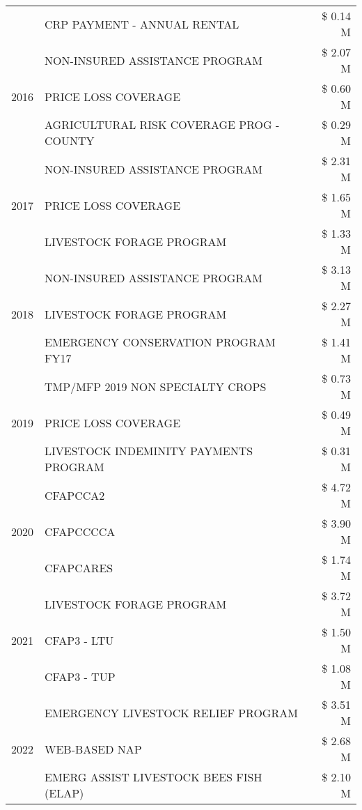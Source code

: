 \begin{tabular}{llr}
 & CRP PAYMENT - ANNUAL RENTAL & \$ 0.14 M \\
\cline{1-3}
\multirow[t]{3}{*}{2016} & NON-INSURED ASSISTANCE PROGRAM & \$ 2.07 M \\
 & PRICE LOSS COVERAGE & \$ 0.60 M \\
 & AGRICULTURAL RISK COVERAGE PROG - COUNTY & \$ 0.29 M \\
\cline{1-3}
\multirow[t]{3}{*}{2017} & NON-INSURED ASSISTANCE PROGRAM & \$ 2.31 M \\
 & PRICE LOSS COVERAGE & \$ 1.65 M \\
 & LIVESTOCK FORAGE PROGRAM & \$ 1.33 M \\
\cline{1-3}
\multirow[t]{3}{*}{2018} & NON-INSURED ASSISTANCE PROGRAM & \$ 3.13 M \\
 & LIVESTOCK FORAGE PROGRAM & \$ 2.27 M \\
 & EMERGENCY CONSERVATION PROGRAM FY17 & \$ 1.41 M \\
\cline{1-3}
\multirow[t]{3}{*}{2019} & TMP/MFP 2019 NON SPECIALTY CROPS & \$ 0.73 M \\
 & PRICE LOSS COVERAGE & \$ 0.49 M \\
 & LIVESTOCK INDEMINITY PAYMENTS PROGRAM & \$ 0.31 M \\
\cline{1-3}
\multirow[t]{3}{*}{2020} & CFAPCCA2 & \$ 4.72 M \\
 & CFAPCCCCA & \$ 3.90 M \\
 & CFAPCARES & \$ 1.74 M \\
\cline{1-3}
\multirow[t]{3}{*}{2021} & LIVESTOCK FORAGE PROGRAM & \$ 3.72 M \\
 & CFAP3 - LTU & \$ 1.50 M \\
 & CFAP3 - TUP & \$ 1.08 M \\
\cline{1-3}
\multirow[t]{3}{*}{2022} & EMERGENCY LIVESTOCK RELIEF PROGRAM & \$ 3.51 M \\
 & WEB-BASED NAP & \$ 2.68 M \\
 & EMERG ASSIST LIVESTOCK BEES FISH (ELAP) & \$ 2.10 M \\
\cline{1-3}
\bottomrule
\end{tabular}
